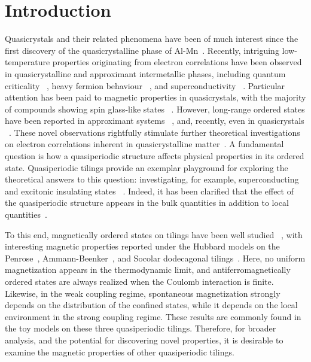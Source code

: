 \documentclass[aps,twocolumn,pra,superscriptaddress,amsmath,amssymb]{revtex4-1}
\begin{document}
\section{Introduction}
Quasicrystals and their related phenomena have been of much interest
since the first discovery of the quasicrystalline phase of Al-Mn~\cite{Shechtman}.
Recently, intriguing low-temperature properties originating from electron correlations have been observed
in quasicrystalline and approximant intermetallic phases, including quantum criticality ~\cite{Ishimasa_2011,Deguchi_2012},
heavy fermion behaviour ~\cite{Ishimasa_2011,Deguchi_2012}, and superconductivity ~\cite{Kamiya_2018}.
Particular attention has been paid to magnetic properties in quasicrystals, with the majority of compounds showing spin glass-like states ~\cite{Shechtman,Kimura_1986,SG1,SG2,Chen_1986,SG1,Tsai_1988,AlMnGe,Hattori_1995,Charrier_1997,Sato_1998,Sato_2001}. However, long-range ordered states have been reported in approximant systems ~\cite{Tamura_2010}, and, recently, even in quasicrystals ~\cite{Tamura}.
These novel observations rightfully stimulate further theoretical investigations on electron correlations
inherent in quasicrystalline matter~\cite{Takemori,Takemura,Shinzaki,Hauck}.
A fundamental question is how a quasiperiodic structure affects physical properties in its ordered state. Quasiperiodic tilings provide an exemplar playground for exploring the theoretical answers to this question: investigating,
for example, superconducting and excitonic insulating states ~\cite{Sakai_2017,Sakai_2019,Inayoshi_2020,Cao}.
Indeed, it has been clarified that the effect of the quasiperiodic structure appears in the bulk quantities
in addition to local quantities~\cite{Takemori_2020}. 

To this end, magnetically ordered states on tilings have been well studied ~\cite{Wessel_2003,Jagannathan_2007,Jagannathan_Schulz_1997,Koga_Tsunetsugu,Koga_AB,Koga_dodeca,SakaiKoga},
with interesting magnetic properties reported under the Hubbard models on the Penrose~\cite{Jagannathan_2007,Koga_Tsunetsugu},
Ammann-Beenker~\cite{Jagannathan_Schulz_1997,Koga_AB},
and Socolar dodecagonal tilings~\cite{Koga_dodeca}. Here, no uniform magnetization appears in the thermodynamic limit, and
antiferromagnetically ordered states are always realized when the Coulomb interaction is finite. 
Likewise, in the weak coupling regime, spontaneous magnetization strongly depends on
the distribution of the confined states, while it depends on the local environment in the strong coupling regime.
These results are commonly found in the toy models on these three quasiperiodic tilings.
Therefore, for broader analysis, and the potential for discovering novel properties, it is desirable to examine the magnetic properties of other quasiperiodic tilings.
\end{document}
